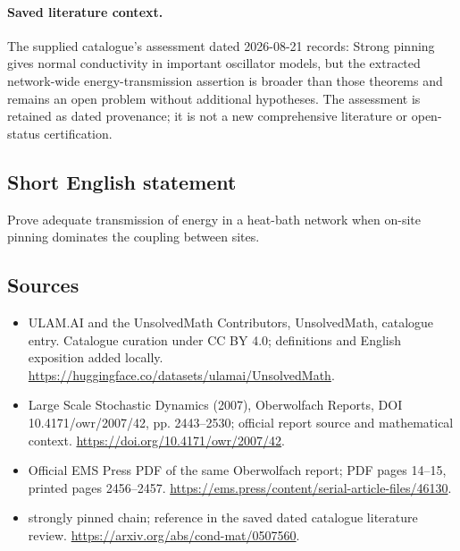 \documentclass[11pt]{article}
\begin{document}
\paragraph{Saved literature context.} The supplied catalogue's assessment dated 2026-08-21 records: Strong pinning gives normal conductivity in important oscillator models, but the extracted network-wide energy-transmission assertion is broader than those theorems and remains an open problem without additional hypotheses. The assessment is retained as dated provenance; it is not a new comprehensive literature or open-status certification.
\subsection{Short English statement}
Prove adequate transmission of energy in a heat-bath network when on-site pinning dominates the coupling between sites.
\subsection{Sources}
\begin{itemize}
\item[\hypertarget{source:statement:1}{S1}] ULAM.AI and the UnsolvedMath Contributors, UnsolvedMath, catalogue entry. Catalogue curation under CC BY 4.0; definitions and English exposition added locally.
\url{https://huggingface.co/datasets/ulamai/UnsolvedMath}.
\item[\hypertarget{source:statement:2}{S2}] Large Scale Stochastic Dynamics (2007), Oberwolfach Reports, DOI 10.4171/owr/2007/42, pp. 2443--2530; official report source and mathematical context.
\url{https://doi.org/10.4171/owr/2007/42}.
\item[\hypertarget{source:statement:3}{S3}] Official EMS Press PDF of the same Oberwolfach report; PDF pages 14--15, printed pages 2456--2457.
\url{https://ems.press/content/serial-article-files/46130}.
\item[\hypertarget{source:statement:4}{S4}] strongly pinned chain; reference in the saved dated catalogue literature review.
\url{https://arxiv.org/abs/cond-mat/0507560}.
\end{itemize}
\label{end:statement}
\end{document}

